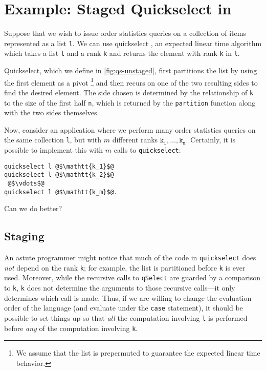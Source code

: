 \section {Example: Staged Quickselect in \texorpdfstring{\lang}{λ12}}
\label{sec:staging}




Suppose that we wish to issue order statistics queries on a collection of items
represented as a list \texttt{l}. We can use quickselect \cite{quickselect}, an
expected linear time algorithm which takes a list \texttt{l} and a rank
\texttt{k} and returns the element with rank \texttt{k} in \texttt{l}.

Quickselect, which we define in \ref{fig:qs-unstaged}, first partitions the list
by using the first element as a pivot%
\footnote{We assume that the list is prepermuted to guarantee the expected
linear time behavior.}
and then recurs on one of the two resulting sides to find the desired element.
The side chosen is determined by the relationship of \texttt{k} to the size of
the first half \texttt{n}, which is returned by the \texttt{partition} function
along with the two sides themselves.

Now, consider an application where we perform many order statistics queries on
the same collection \texttt{l}, but with $m$ different ranks
$\mathtt{k_1},\dots,\mathtt{k_m}$.
Certainly, it is possible to implement this with $m$ calls to
\texttt{quickselect}:
%
\begin{lstlisting}
quickselect l @$\mathtt{k_1}$@
quickselect l @$\mathtt{k_2}$@
 @$\vdots$@ 
quickselect l @$\mathtt{k_m}$@.
\end{lstlisting}
%
Can we do better?

\subsection{Staging}

An astute programmer might notice that much of the code in \texttt{quickselect}
does \emph{not} depend on the rank \texttt{k}; for example, the list is
partitioned before \texttt{k} is ever used. Moreover, while the recursive calls
to \texttt{qSelect} are guarded by a comparison to \texttt{k}, \texttt{k} does
not determine the arguments to those recursive calls---it only determines which
call is made. Thus, if we are willing to change the evaluation order of the
language (and evaluate under the \texttt{case} statement), it should be possible
to set things up so that \emph{all} the computation involving \texttt{l} is
performed before \emph{any} of the computation involving \texttt{k}.

